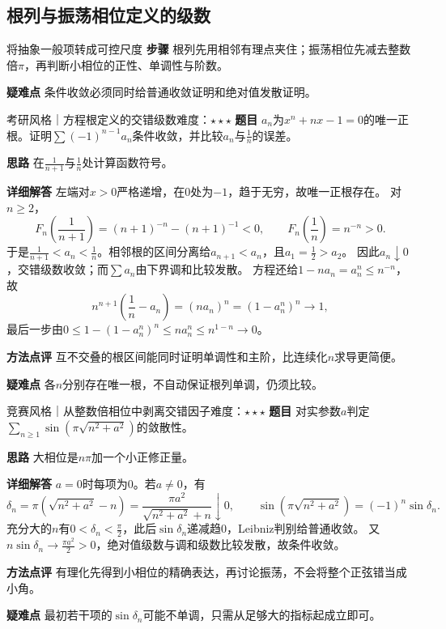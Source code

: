 \subsection{根列与振荡相位定义的级数}\label{cse:rootphase}
\begin{method}{将抽象一般项转成可控尺度}
\textbf{步骤} 根列先用相邻有理点夹住；振荡相位先减去整数倍$\pi$，再判断小相位的正性、单调性与阶数。
\par\textbf{疑难点} 条件收敛必须同时给普通收敛证明和绝对值发散证明。
\end{method}
\begin{example}{考研风格｜方程根定义的交错级数}{难度：$\star\star\star$}\label{cse:ex:rootseries}
\textbf{题目} $a_n$为$x^n+nx-1=0$的唯一正根。证明$\sum(-1)^{n-1}a_n$条件收敛，并比较$a_n$与$\frac{1}{n}$的误差。
\par\textbf{思路} 在$\frac{1}{n+1}$与$\frac{1}{n}$处计算函数符号。
\par\textbf{详细解答} 左端对$x>0$严格递增，在0处为$-1$，趋于无穷，故唯一正根存在。
对$n\ge2$，
\[
F_n(\dfrac{1}{n+1})=(n+1)^{-n}-(n+1)^{-1}<0,\qquad
F_n(\dfrac{1}{n})=n^{-n}>0.
\]
于是$\frac{1}{n+1}<a_n<\frac{1}{n}$。相邻根的区间分离给$a_{n+1}<a_n$，且$a_1=\frac{1}{2}>a_2$。
因此$a_n\downarrow0$，交错级数收敛；而$\sum a_n$由下界调和比较发散。
方程还给$1-na_n=a_n^n\le n^{-n}$，故
\[
n^{n+1}(\dfrac{1}{n}-a_n)=(na_n)^n=(1-a_n^n)^n\longrightarrow1,
\]
最后一步由$0\le1-(1-a_n^n)^n\le n a_n^n\le n^{1-n}\to0$。
\par\textbf{方法点评} 互不交叠的根区间能同时证明单调性和主阶，比连续化$n$求导更简便。
\par\textbf{疑难点} 各$n$分别存在唯一根，不自动保证根列单调，仍须比较。
\end{example}

\begin{example}{竞赛风格｜从整数倍相位中剥离交错因子}{难度：$\star\star\star$}\label{cse:ex:phase}
\textbf{题目} 对实参数$a$判定$\sum_{n\ge1}\sin(\pi\sqrt{n^2+a^2})$的敛散性。
\par\textbf{思路} 大相位是$n\pi$加一个小正修正量。
\par\textbf{详细解答} $a=0$时每项为0。若$a\ne0$，有
\[
\delta_n=\pi(\sqrt{n^2+a^2}-n)
=\dfrac{\pi a^2}{\sqrt{n^2+a^2}+n}\downarrow0,\qquad
\sin(\pi\sqrt{n^2+a^2})=(-1)^n\sin\delta_n.
\]
充分大的$n$有$0<\delta_n<\frac{\pi}{2}$，此后$\sin\delta_n$递减趋0，Leibniz判别给普通收敛。
又$n\sin\delta_n\to\frac{\pi a^2}{2}>0$，绝对值级数与调和级数比较发散，故条件收敛。
\par\textbf{方法点评} 有理化先得到小相位的精确表达，再讨论振荡，不会将整个正弦错当成小角。
\par\textbf{疑难点} 最初若干项的$\sin\delta_n$可能不单调，只需从足够大的指标起成立即可。
\end{example}

